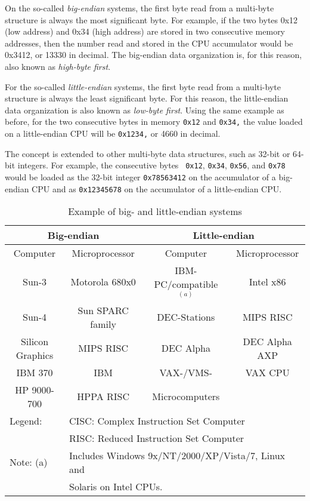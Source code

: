 On the so-called {\em big-endian} systems, the first byte read from a
multi-byte structure is always the most significant byte. For example,
if the two bytes 0x12 (low address) and 0x34 (high address) are stored
in two consecutive memory addresses, then the number read and stored
in the CPU accumulator would be 0x3412, or 13330 in decimal. The
big-endian data organization is, for this reason, also known as {\em
high-byte first}.

For the so-called {\em little-endian} systems, the first byte read
from a multi-byte structure is always the least significant byte. For
this reason, the little-endian data organization is also known as {\em
low-byte first}. Using the same example as before, for the two
consecutive bytes in memory {\tt 0x12} and {\tt 0x34,} the value
loaded on a little-endian CPU will be {\tt 0x1234,} or 4660 in
decimal.

The concept is extended to other multi-byte data structures, such as
32-bit or 64-bit integers. For example, the consecutive bytes {\tt
0x12}, {\tt 0x34}, {\tt 0x56}, and {\tt 0x78} would be loaded as the
32-bit integer {\tt 0x78563412} on the accumulator of a big-endian CPU
and as {\tt 0x12345678} on the accumulator of a little-endian CPU.

\begin{table}
\caption{\SF Example of big- and little-endian systems
         \label{tbl:known-endian}}
\begin{tabular}{|c|c||c|c|}
\hline
\multicolumn{2}{|c||}{Big-endian} & \multicolumn{2}{|c|}{Little-endian} \\
\hline
Computer & Microprocessor
        & Computer & Microprocessor\\
\hline
Sun-3 & Motorola 680x0
        &IBM-PC/compatible$^{(a)}$ & Intel x86\\
Sun-4 & Sun SPARC family
        &DEC-Stations &MIPS RISC\\
Silicon Graphics & MIPS RISC
        &DEC Alpha &DEC Alpha AXP\\
IBM 370 & IBM
        &VAX-/VMS- & VAX CPU\\
HP 9000-700 & HPPA RISC
        & Microcomputers & \\
\hline
\multicolumn{1}{|l}{Legend:}
        &\multicolumn{3}{l|}{CISC: Complex Instruction Set Computer}\\
\multicolumn{1}{|l}{ }
        &\multicolumn{3}{l|}{RISC: Reduced Instruction Set Computer}\\
\multicolumn{1}{|l}{Note: (a)} &
\multicolumn{3}{l|}{Includes Windows 9x/NT/2000/XP/Vista/7, Linux and}\\
\multicolumn{1}{|l}{ } &
\multicolumn{3}{l|}{Solaris on Intel CPUs.}\\
\hline
\end{tabular}
\end{table}

